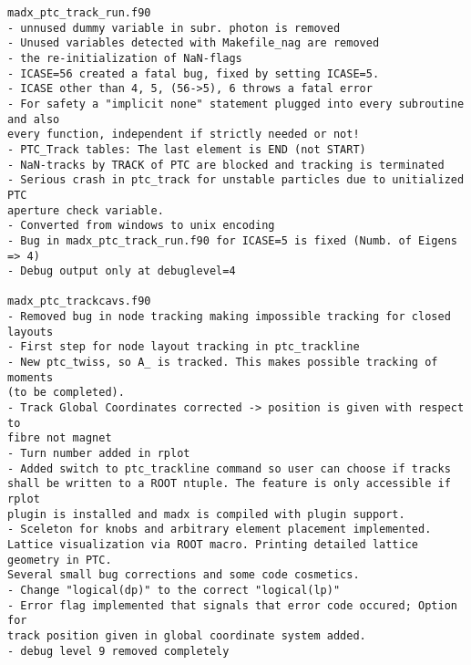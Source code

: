 \begin{verbatim}
madx_ptc_track_run.f90
- unnused dummy variable in subr. photon is removed
- Unused variables detected with Makefile_nag are removed
- the re-initialization of NaN-flags
- ICASE=56 created a fatal bug, fixed by setting ICASE=5.
- ICASE other than 4, 5, (56->5), 6 throws a fatal error
- For safety a "implicit none" statement plugged into every subroutine and also
every function, independent if strictly needed or not!
- PTC_Track tables: The last element is END (not START)
- NaN-tracks by TRACK of PTC are blocked and tracking is terminated
- Serious crash in ptc_track for unstable particles due to unitialized PTC
aperture check variable.
- Converted from windows to unix encoding
- Bug in madx_ptc_track_run.f90 for ICASE=5 is fixed (Numb. of Eigens => 4)
- Debug output only at debuglevel=4

madx_ptc_trackcavs.f90
- Removed bug in node tracking making impossible tracking for closed layouts
- First step for node layout tracking in ptc_trackline
- New ptc_twiss, so A_ is tracked. This makes possible tracking of moments 
(to be completed).
- Track Global Coordinates corrected -> position is given with respect to 
fibre not magnet
- Turn number added in rplot
- Added switch to ptc_trackline command so user can choose if tracks 
shall be written to a ROOT ntuple. The feature is only accessible if rplot 
plugin is installed and madx is compiled with plugin support.
- Sceleton for knobs and arbitrary element placement implemented. 
Lattice visualization via ROOT macro. Printing detailed lattice geometry in PTC. 
Several small bug corrections and some code cosmetics.
- Change "logical(dp)" to the correct "logical(lp)"
- Error flag implemented that signals that error code occured; Option for 
track position given in global coordinate system added.
- debug level 9 removed completely


\end{verbatim}
